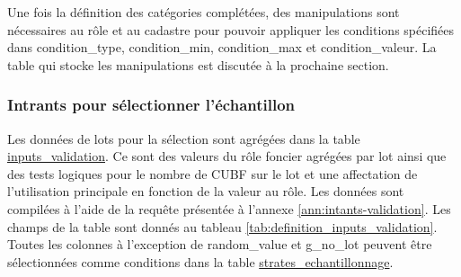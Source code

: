         Une fois la définition des catégories complétées, des manipulations sont nécessaires au rôle et au cadastre pour pouvoir appliquer les conditions spécifiées dans condition\_type, condition\_min, condition\_max et condition\_valeur. La table qui stocke les manipulations est discutée à la prochaine section.
    \subsubsection{Intrants pour sélectionner l'échantillon} 
        Les données de lots pour la sélection sont agrégées dans la table \ul{inputs\_validation}. Ce sont des valeurs du rôle foncier agrégées par lot ainsi que des tests logiques pour le nombre de \ac{CUBF} sur le lot et une affectation de l'utilisation principale en fonction de la valeur au rôle. Les données sont compilées à l'aide de la requête présentée à l'annexe \ref{ann:intants-validation}. Les champs de la table sont donnés au tableau \ref{tab:definition_inputs_validation}. Toutes les colonnes à l'exception de random\_value et g\_no\_lot peuvent être sélectionnées comme conditions dans la table \ul{strates\_echantillonnage}.
